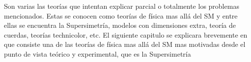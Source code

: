 Son varias las teorías que intentan explicar parcial o totalmente los problemas
mencionados. Estas se conocen como teorías de física mas allá del SM y entre
ellas se encuentra la Supersimetría, modelos con dimensiones extra, teoría de
cuerdas, teorías technicolor, etc. El siguiente capitulo se explicara brevemente
en que consiste una de las teorías de física mas allá del SM mas motivadas desde
el punto de vista teórico y experimental, que es la Supersimetría

